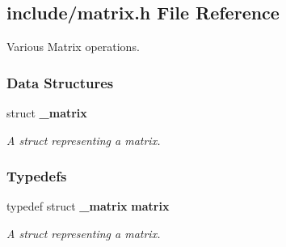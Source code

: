 \subsection{include/matrix.h File Reference}
\label{matrix_8h}


Various Matrix operations.  


\subsubsection*{Data Structures}
\begin{DoxyCompactItemize}
\item 
struct \textbf{ \+\_\+matrix}
\begin{DoxyCompactList}\small\item\em A struct representing a matrix. \end{DoxyCompactList}\end{DoxyCompactItemize}
\subsubsection*{Typedefs}
\begin{DoxyCompactItemize}
\item 
typedef struct \textbf{ \+\_\+matrix} \textbf{ matrix}
\begin{DoxyCompactList}\small\item\em A struct representing a matrix. \end{DoxyCompactList}\end{DoxyCompactItemize}
